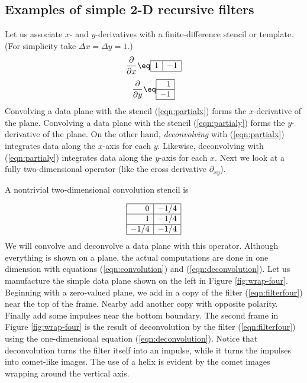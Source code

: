 \subsection{Examples of simple 2-D recursive filters}
Let us associate $x$- and $y$-derivatives with
a finite-difference stencil or template.
(For simplicity take $\Delta x=\Delta y=1$.)
\begin{equation}
 \frac{\partial }{ \partial x } \eq
 \begin{array}{|c|c|} \hline
   1    & -1
   \\ \hline
 \end{array}
 \label{eqn:partialx}
\end{equation}
\begin{equation}
 \frac{\partial }{ \partial y } \eq
  \begin{array}{|r|} \hline
    1  \\
    \hline
    -1
    \\ \hline
  \end{array}
  \label{eqn:partialy}
\end{equation}
Convolving a data plane with
the stencil (\ref{eqn:partialx})
forms the $x$-derivative of the plane.
Convolving a data plane with
the stencil (\ref{eqn:partialy})
forms the $y$-derivative of the plane.
On the other hand,
{\it deconvolving}
with (\ref{eqn:partialx}) integrates data along the $x$-axis for each $y$.
Likewise, deconvolving
with (\ref{eqn:partialy}) integrates data along the $y$-axis for each $x$.
Next we look at a fully two-dimensional operator
(like the cross derivative $\partial_{xy}$).


\par
A nontrivial two-dimensional convolution stencil is
\par
\begin{equation}
        \begin{array}{|r|r|}   \hline
                0    & -1/4 \\
                \hline
                1    & -1/4 \\
                \hline
                -1/4 & -1/4
                \\ \hline
        \end{array}
\label{eqn:filterfour}
\end{equation}
We will convolve and deconvolve a data plane with this operator.
Although everything is shown on a plane,
the actual computations are done in one dimension
with equations
(\ref{eqn:convolution}) and
(\ref{eqn:deconvolution}).
Let us manufacture the simple data plane
shown on the left in Figure \ref{fig:wrap-four}.
Beginning with a zero-valued plane, we add
in a copy of the filter (\ref{eqn:filterfour})
near the top of the frame.
Nearby add another copy with opposite polarity.
Finally add some impulses near the bottom boundary.
The second frame in Figure \ref{fig:wrap-four} is the result
of deconvolution by the filter (\ref{eqn:filterfour})
using the one-dimensional equation (\ref{eqn:deconvolution}).
Notice that deconvolution
turns the filter itself into an impulse,
while it turns the impulses
into comet-like images.
The use of a helix is evident
by the comet images wrapping around the vertical axis.


